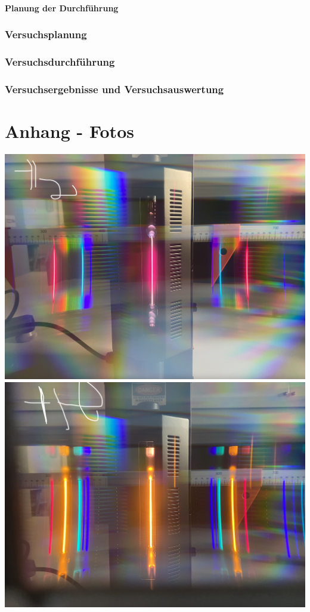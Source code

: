 \documentclass[12pt,oneside,oldfontcommands]{memoir}
\begin{document}
\paragraph{Planung der Durchführung}
\subsubsection{Versuchsplanung}
\subsubsection{Versuchsdurchführung}
\subsubsection{Versuchsergebnisse und Versuchsauswertung}

\section{Anhang - Fotos}
\includegraphics[width=.96\columnwidth]{figures/IMG_5291.jpg}
\includegraphics[width=.96\columnwidth]{figures/IMG_5292.jpg}
\end{document}
